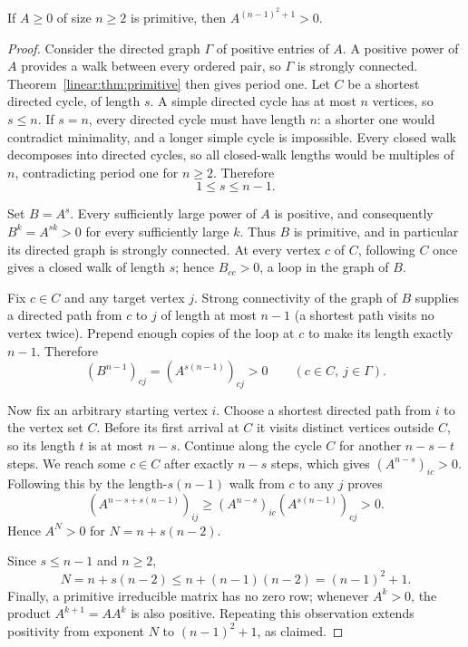 \begin{theorem}[Wielandt]\label{linear:thm:wielandt}
If $A\ge0$ of size $n\ge2$ is primitive, then $A^{(n-1)^2+1}>0$.
\end{theorem}
\begin{proof}
Consider the directed graph $\Gamma$ of positive entries of
$A$. A positive power of $A$ provides a walk between every ordered pair,
so $\Gamma$ is strongly connected. Theorem~\ref{linear:thm:primitive}
then gives period one.
Let $C$ be a shortest directed cycle, of length $s$.
A simple directed cycle has at most $n$ vertices, so $s\le n$.
If $s=n$, every directed cycle must have length $n$:
a shorter one would contradict minimality, and a longer
simple cycle is impossible. Every closed walk decomposes
into directed cycles, so all closed-walk lengths would be
multiples of $n$, contradicting period one for $n\ge2$.
Therefore
\[
1\le s\le n-1.
\]

Set $B=A^s$. Every sufficiently large power of $A$
is positive, and consequently $B^k=A^{sk}>0$
for every sufficiently large $k$. Thus $B$ is primitive,
and in particular its directed graph is strongly connected.
At every vertex $c$ of $C$, following $C$ once gives a
closed walk of length $s$; hence $B_{cc}>0$, a loop in
the graph of $B$.

Fix $c\in C$ and any target vertex $j$.
Strong connectivity of the graph of $B$ supplies a
directed path from $c$ to $j$ of length at most $n-1$
(a shortest path visits no vertex twice).
Prepend enough copies of the loop at $c$ to make
its length exactly $n-1$. Therefore
\[
(B^{n-1})_{cj}=(A^{s(n-1)})_{cj}>0
\qquad(c\in C,\ j\in\Gamma).
\]

Now fix an arbitrary starting vertex $i$. Choose a
shortest directed path from $i$ to the vertex set $C$.
Before its first arrival at $C$ it visits distinct
vertices outside $C$, so its length $t$ is at most
$n-s$. Continue along the cycle $C$ for another
$n-s-t$ steps. We reach some $c\in C$ after
exactly $n-s$ steps, which gives
$(A^{n-s})_{ic}>0$. Following this by the
length-$s(n-1)$ walk from $c$ to any $j$ proves
\[
(A^{n-s+s(n-1)})_{ij}
\ge (A^{n-s})_{ic}(A^{s(n-1)})_{cj}>0.
\]
Hence $A^N>0$ for $N=n+s(n-2)$.

Since $s\le n-1$ and $n\ge2$,
\[
N=n+s(n-2)
\le n+(n-1)(n-2)=(n-1)^2+1.
\]
Finally, a primitive irreducible matrix has no zero
row; whenever $A^k>0$, the product $A^{k+1}=AA^k$
is also positive. Repeating this observation
extends positivity from exponent $N$ to
$(n-1)^2+1$, as claimed.
\end{proof}

